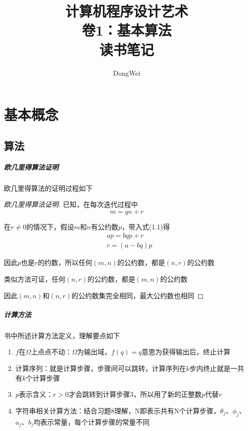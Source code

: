 \documentclass[openany,UTF8]{ctexbook}
\title{计算机程序设计艺术\\卷1：基本算法\\读书笔记}
\author{DongWei}
\date{}
\begin{document}
\maketitle

\tableofcontents

\newpage

\chapter{基本概念}
\section{算法}

\paragraph{欧几里得算法证明}
欧几里得算法的证明过程如下
\begin{proof}[欧几里得算法证明]
  已知，在每次迭代过程中
  \begin{equation}
    m=qn+r
  \end{equation}

  在$r\neq0$的情况下，假设$m$和$n$有公约数$p$，带入式(1.1)得
  \begin{equation}
    \begin{aligned}
      &ap=bqp+r \\
      &r=(a-bq)p
    \end{aligned}
  \end{equation}
  
  因此$p$也是$r$的约数，所以任何$(m,n)$的公约数，都是$(n,r)$的公约数
  
  类似方法可证，任何$(n,r)$的公约数，都是$(m,n)$的公约数
  
  因此$(m,n)$和$(n,r)$的公约数集完全相同，最大公约数也相同
\end{proof}

\paragraph{计算方法}
书中所述计算方法定义，理解要点如下
\begin{enumerate}
\item $f$在$\Omega$上点点不动：$\Omega$为输出域，$f(q)=q$意思为获得输出后，终止计算
\item 计算序列：就是计算步骤，步骤间可以跳转，计算序列在$k$步内终止就是一共有$k$个计算步骤
\item $p$表示含义：$r>0$才会跳转到计算步骤3，所以用了新的正整数$p$代替$r$
\item 字符串相关计算方法：结合习题8理解，N即表示共有N个计算步骤，$\theta_j$、$\phi_j$、$a_j$、$b_j$均表示常量，每个计算步骤的常量不同
\end{enumerate}
  
\end{document}
